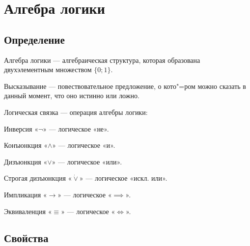 \section{Алгебра логики}

\subsection{Определение}

{\bold Алгебра логики} --- алгебраическая структура, которая образована двухэлементным множеством $\{0;1\}$.

{\bold Высказывание} --- повествовательное предложение, о кото"=ром можно сказать в данный момент, что оно {\ital истинно} или {\ital ложно}.

{\bold Логическая связка} --- операция алгебры логики:
\begin{list*}[][\#]
\item{\ital Инверсия} «$\lnot$» --- логическое {\ital «не»}.
\item{\ital Конъюнкция} «$\land$» --- логическое {\ital «и»}.
\item{\ital Дизъюнкция} «$\lor$» --- логическое {\ital «или»}.
\item{\ital Строгая дизъюнкция} «$\dot{\lor}$» --- логическое {\ital «искл. или»}.
\item{\ital Импликация} «$\rightarrow$» --- логическое {\ital «$\implies$»}.
\item{\ital Эквиваленция} «$\equiv$» --- логическое {\ital «$\iff$»}.
\end{list*}

\subsection{Свойства}


